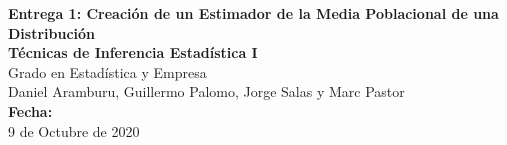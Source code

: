 
\onehalfspacing
{}


\begin{center}
\LARGE{\textbf{Entrega 1: Creación de un Estimador de la Media Poblacional de una Distribución}}\\
\vspace*{2\baselineskip}
\Large{\textbf{Técnicas de Inferencia Estadística I}}\\
\normalsize{Grado en Estadística y Empresa}\\
\vspace*{2\baselineskip}
\Large{Daniel Aramburu, Guillermo Palomo, Jorge Salas y Marc Pastor}\\
\vspace*{1\baselineskip}
\Large{\textbf{Fecha:}}\\
9 de Octubre de 2020
\end{center}



